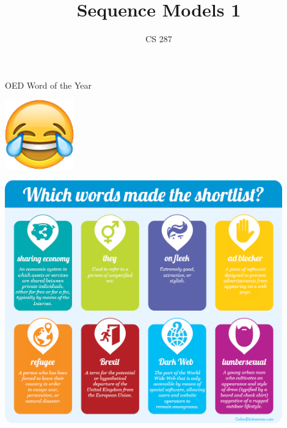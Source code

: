 \documentclass{beamer}
\title{Sequence Models 1}
\date{}
\author{CS 287}
\begin{document}
\begin{frame}
  \titlepage
\end{frame}

\begin{frame}{OED Word of the Year}
  \begin{center}
    \includegraphics[width=3cm]{tears}
  \end{center}
\end{frame}

\begin{frame}
  \begin{center}
    \includegraphics[width=0.9\textwidth]{shortlist}
  \end{center}
\end{frame}
\end{document}

